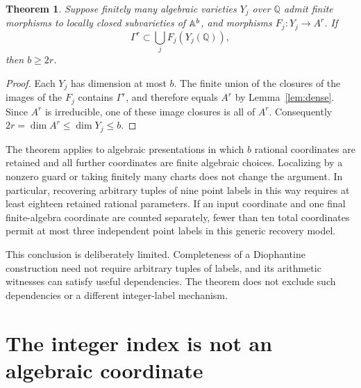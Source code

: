 \documentclass[11pt,a4paper]{article}
\newtheorem{theorem}{Theorem}[section]
\theoremstyle{remark}\newtheorem{remark}[theorem]{Remark}
\newcommand{\Q}{\mathbb Q}\newcommand{\Z}{\mathbb Z}
\begin{document}
\begin{theorem}\label{thm:dimension}
Suppose finitely many algebraic varieties $Y_j$ over $\Q$ admit
finite morphisms to locally closed subvarieties of $\mathbb A^b$, and
morphisms $F_j:Y_j\to A^r$.  If
\[
            \Gamma^r\subset\bigcup_jF_j(Y_j(\Q)),
\]
then $b\ge2r$.
\end{theorem}
\begin{proof}
Each $Y_j$ has dimension at most $b$.  The finite union of the
closures of the images of the $F_j$ contains $\Gamma^r$, and
therefore equals $A^r$ by Lemma~\ref{lem:dense}.  Since $A^r$ is
irreducible, one of these image closures is all of $A^r$.
Consequently $2r=\dim A^r\le\dim Y_j\le b$.
\end{proof}

The theorem applies to algebraic presentations in which $b$
rational coordinates are retained and all further coordinates are
finite algebraic choices.  Localizing by a nonzero guard or taking
finitely many charts does not change the argument.  In particular,
recovering arbitrary tuples of nine point labels in this way requires
at least eighteen retained rational parameters.  If an input
coordinate and one final finite-algebra coordinate are counted
separately, fewer than ten total coordinates permit at most three
independent point labels in this generic recovery model.

This conclusion is deliberately limited.  Completeness of a
Diophantine construction need not require arbitrary tuples of
labels, and its arithmetic witnesses can satisfy useful dependencies.
The theorem does not exclude such dependencies or a different
integer-label mechanism.

\section{The integer index is not an algebraic coordinate}
\end{document}
